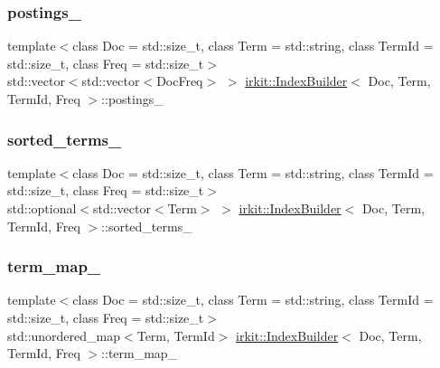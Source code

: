 \mbox{\label{classirkit_1_1IndexBuilder_a4dcd133d2afe183e6f5bb379592391c4}} 
\subsubsection{\texorpdfstring{postings\+\_\+}{postings\_}}
{\footnotesize\ttfamily template$<$class Doc  = std\+::size\+\_\+t, class Term  = std\+::string, class Term\+Id  = std\+::size\+\_\+t, class Freq  = std\+::size\+\_\+t$>$ \\
std\+::vector$<$std\+::vector$<$Doc\+Freq$>$ $>$ \hyperlink{classirkit_1_1IndexBuilder}{irkit\+::\+Index\+Builder}$<$ Doc, Term, Term\+Id, Freq $>$\+::postings\+\_\+\hspace{0.3cm}{\ttfamily [protected]}}

\mbox{\label{classirkit_1_1IndexBuilder_a7a6b13e964f05c659fe17cf61a9738e9}} 
\subsubsection{\texorpdfstring{sorted\+\_\+terms\+\_\+}{sorted\_terms\_}}
{\footnotesize\ttfamily template$<$class Doc  = std\+::size\+\_\+t, class Term  = std\+::string, class Term\+Id  = std\+::size\+\_\+t, class Freq  = std\+::size\+\_\+t$>$ \\
std\+::optional$<$std\+::vector$<$Term$>$ $>$ \hyperlink{classirkit_1_1IndexBuilder}{irkit\+::\+Index\+Builder}$<$ Doc, Term, Term\+Id, Freq $>$\+::sorted\+\_\+terms\+\_\+\hspace{0.3cm}{\ttfamily [protected]}}

\mbox{\label{classirkit_1_1IndexBuilder_aeebb03b89eeab532f62239e4ea4f0bee}} 
\subsubsection{\texorpdfstring{term\+\_\+map\+\_\+}{term\_map\_}}
{\footnotesize\ttfamily template$<$class Doc  = std\+::size\+\_\+t, class Term  = std\+::string, class Term\+Id  = std\+::size\+\_\+t, class Freq  = std\+::size\+\_\+t$>$ \\
std\+::unordered\+\_\+map$<$Term, Term\+Id$>$ \hyperlink{classirkit_1_1IndexBuilder}{irkit\+::\+Index\+Builder}$<$ Doc, Term, Term\+Id, Freq $>$\+::term\+\_\+map\+\_\+\hspace{0.3cm}{\ttfamily [protected]}}

